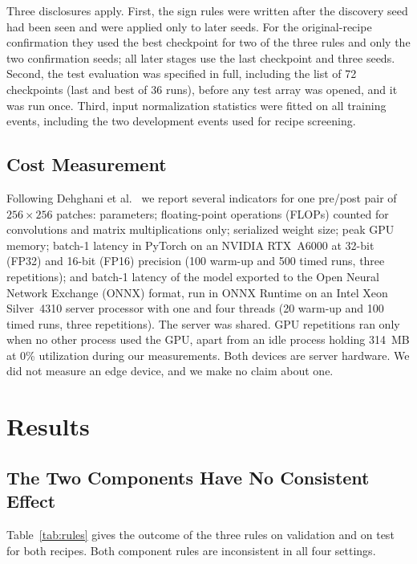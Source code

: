 \documentclass[runningheads]{llncs}
\begin{document}
Three disclosures apply. First, the sign rules were written after the discovery seed had
been seen and were applied only to later seeds. For the original-recipe confirmation they
used the best checkpoint for two of the three rules and only the two confirmation seeds; all
later stages use the last checkpoint and three seeds. Second, the test evaluation was
specified in full, including the list of 72 checkpoints (last and best of 36 runs), before
any test array was opened, and it was run once. Third, input normalization statistics were
fitted on all training events, including the two development events used for recipe
screening.

\subsection{Cost Measurement}
\label{sec:costprotocol}

Following Dehghani et al.~\cite{dehghani2022efficiency} we report several indicators for one
pre/post pair of $256\times 256$ patches: parameters; floating-point operations (FLOPs)
counted for convolutions and matrix multiplications only; serialized weight size; peak GPU memory; batch-1 latency in
PyTorch on an NVIDIA RTX~A6000 at 32-bit (FP32) and 16-bit (FP16) precision (100 warm-up
and 500 timed runs, three repetitions); and batch-1 latency of the model exported to the Open Neural Network Exchange
(ONNX) format, run in ONNX
Runtime on an Intel Xeon Silver~4310 server processor
with one and four threads (20 warm-up and 100 timed runs, three repetitions). The server was
shared. GPU repetitions ran only when no other process used the GPU, apart from an idle
process holding 314~MB at 0\% utilization during our measurements. Both devices are
server hardware. We did not measure an edge device, and we make no claim about one.

\section{Results}

\subsection{The Two Components Have No Consistent Effect}
\label{sec:components}

Table~\ref{tab:rules} gives the outcome of the three rules on validation and on test for
both recipes. Both component rules are inconsistent in all four settings.
\end{document}
